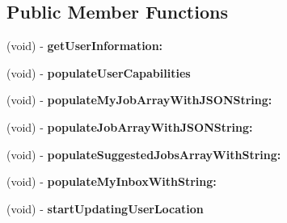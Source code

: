 \subsection*{\-Public \-Member \-Functions}
\begin{DoxyCompactItemize}
\item 
\hypertarget{interface_u_s_e_r_i_n_f_o_r_m_a_t_i_o_n_a_n_d_a_p_p_s_t_a_t_e_a264e6aa3bc9da87b9203414137270590}{
(void) -\/ {\bfseries get\-User\-Information\-:}}
\label{interface_u_s_e_r_i_n_f_o_r_m_a_t_i_o_n_a_n_d_a_p_p_s_t_a_t_e_a264e6aa3bc9da87b9203414137270590}

\item 
\hypertarget{interface_u_s_e_r_i_n_f_o_r_m_a_t_i_o_n_a_n_d_a_p_p_s_t_a_t_e_adf5aa4d248d478d3ef8db045b1e49f97}{
(void) -\/ {\bfseries populate\-User\-Capabilities}}
\label{interface_u_s_e_r_i_n_f_o_r_m_a_t_i_o_n_a_n_d_a_p_p_s_t_a_t_e_adf5aa4d248d478d3ef8db045b1e49f97}

\item 
\hypertarget{interface_u_s_e_r_i_n_f_o_r_m_a_t_i_o_n_a_n_d_a_p_p_s_t_a_t_e_a84b4711249c8411894fff642c058a812}{
(void) -\/ {\bfseries populate\-My\-Job\-Array\-With\-J\-S\-O\-N\-String\-:}}
\label{interface_u_s_e_r_i_n_f_o_r_m_a_t_i_o_n_a_n_d_a_p_p_s_t_a_t_e_a84b4711249c8411894fff642c058a812}

\item 
\hypertarget{interface_u_s_e_r_i_n_f_o_r_m_a_t_i_o_n_a_n_d_a_p_p_s_t_a_t_e_af4b16ab885c60e56d2aefe42fcf804a9}{
(void) -\/ {\bfseries populate\-Job\-Array\-With\-J\-S\-O\-N\-String\-:}}
\label{interface_u_s_e_r_i_n_f_o_r_m_a_t_i_o_n_a_n_d_a_p_p_s_t_a_t_e_af4b16ab885c60e56d2aefe42fcf804a9}

\item 
\hypertarget{interface_u_s_e_r_i_n_f_o_r_m_a_t_i_o_n_a_n_d_a_p_p_s_t_a_t_e_afc32eda9499c00bc120a1a78cda3c1a1}{
(void) -\/ {\bfseries populate\-Suggested\-Jobs\-Array\-With\-String\-:}}
\label{interface_u_s_e_r_i_n_f_o_r_m_a_t_i_o_n_a_n_d_a_p_p_s_t_a_t_e_afc32eda9499c00bc120a1a78cda3c1a1}

\item 
\hypertarget{interface_u_s_e_r_i_n_f_o_r_m_a_t_i_o_n_a_n_d_a_p_p_s_t_a_t_e_a886ea98da7dfcb5a79336ce6371d8636}{
(void) -\/ {\bfseries populate\-My\-Inbox\-With\-String\-:}}
\label{interface_u_s_e_r_i_n_f_o_r_m_a_t_i_o_n_a_n_d_a_p_p_s_t_a_t_e_a886ea98da7dfcb5a79336ce6371d8636}

\item 
\hypertarget{interface_u_s_e_r_i_n_f_o_r_m_a_t_i_o_n_a_n_d_a_p_p_s_t_a_t_e_ad6766ba3f3edb5b3d4b13a101f50c43d}{
(void) -\/ {\bfseries start\-Updating\-User\-Location}}
\label{interface_u_s_e_r_i_n_f_o_r_m_a_t_i_o_n_a_n_d_a_p_p_s_t_a_t_e_ad6766ba3f3edb5b3d4b13a101f50c43d}


\end{DoxyCompactItemize}
